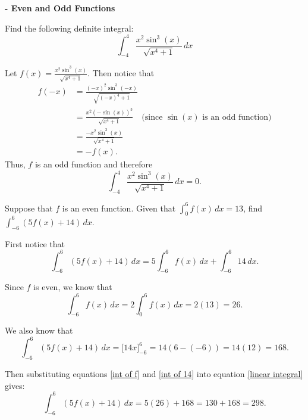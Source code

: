 \documentclass[nooutcomes]{ximera}
\renewcommand{\d}{\,d}
\newcommand{\dfn}{\textbf}
\newcommand{\eval}[1]{\bigg[ #1 \bigg]}
\renewenvironment{freeResponse}{
\ifhandout\setbox0\vbox\bgroup\else
\begin{trivlist}\item[\hskip \labelsep\bfseries Solution:\hspace{2ex}]
\fi}
{\ifhandout\egroup\else
\end{trivlist}
\fi}
\begin{document}
\begin{problem}
\dfn{- Even and Odd Functions}
	\begin{enumerate}
	
	\item  Find the following definite integral:
	\begin{equation*}
	\int_{-4}^4 \frac{x^2 \sin^3(x)}{\sqrt{x^4 + 1}} \d x
	\end{equation*}
		\begin{freeResponse}
		Let $f(x) = \frac{x^2 \sin^3(x)}{\sqrt{x^4 + 1}}$.  
		Then notice that
			\begin{align*}
			f(-x) &= \frac{(-x)^2 \sin^3(-x)}{\sqrt{(-x)^4 + 1}}  \\
			&= \frac{x^2 (- \sin(x))^3}{\sqrt{x^4 + 1}}  \quad \text{(since } \sin(x) \text{ is an odd function)}  \\
			&= \frac{- x^2 \sin^3(x)}{\sqrt{x^4 + 1}}  \\
			&= -f(x).
			\end{align*}
		Thus, $f$ is an odd function and therefore
			\begin{equation*}
			\int_{-4}^4 \frac{x^2 \sin^3(x)}{\sqrt{x^4 + 1}} \d x = 0.
			\end{equation*}
		\end{freeResponse}
		
		
		
	\item  Suppose that $f$ is an even function.  Given that $\int_0^6 f(x) \d x = 13$, find $\int_{-6}^6 (5f(x) + 14) \d x$.
		\begin{freeResponse}
		First notice that
			\begin{equation}\label{linear integral}
			\int_{-6}^6 (5f(x) + 14) \d x = 5 \int_{-6}^6 f(x) \d x + \int_{-6}^6 14 \d x.
			\end{equation}
			
		Since $f$ is even, we know that
			\begin{equation}\label{int of f}
			\int_{-6}^6 f(x) \d x = 2 \int_0^6 f(x) \d x = 2 (13) = 26.
			\end{equation}
			
		We also know that
			\begin{equation}\label{int of 14}
			\int_{-6}^6 (5f(x) + 14) \d x = \eval{14x}_{-6}^6 = 14(6 - (-6)) = 14(12) = 168.
			\end{equation}
			
		Then substituting equations \eqref{int of f} and \eqref{int of 14} into equation \eqref{linear integral} gives:
			\begin{equation*}
			\int_{-6}^6 (5f(x) + 14) \d x = 5(26) + 168 = 130 + 168 = 298.
			\end{equation*}
		\end{freeResponse}
		
		
		
	\end{enumerate}
		
		
\end{problem}
\end{document}
